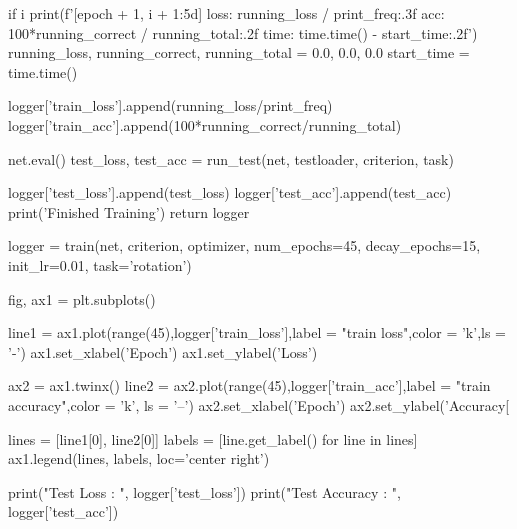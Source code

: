 \documentclass[10pt]{article}
\begin{document}
\begin{python}
            if i %
                print(f'[{epoch + 1}, {i + 1:5d}] loss: {running_loss / print_freq:.3f} acc: {100*running_correct / running_total:.2f} time: {time.time() - start_time:.2f}')
                running_loss, running_correct, running_total = 0.0, 0.0, 0.0
                start_time = time.time()

        logger['train_loss'].append(running_loss/print_freq)
        logger['train_acc'].append(100*running_correct/running_total)

        net.eval()
        test_loss, test_acc = run_test(net, testloader, criterion, task)

    logger['test_loss'].append(test_loss)
    logger['test_acc'].append(test_acc)
    print('Finished Training')
    return logger

logger = train(net, criterion, optimizer, num_epochs=45, decay_epochs=15, init_lr=0.01, task='rotation')

fig, ax1 = plt.subplots()

line1 = ax1.plot(range(45),logger['train_loss'],label = "train loss",color = 'k',ls = '-')
ax1.set_xlabel('Epoch')
ax1.set_ylabel('Loss')

ax2 = ax1.twinx()
line2 = ax2.plot(range(45),logger['train_acc'],label = "train accuracy",color = 'k', ls = '--')
ax2.set_xlabel('Epoch')
ax2.set_ylabel('Accuracy[%

lines = [line1[0], line2[0]]
labels = [line.get_label() for line in lines]
ax1.legend(lines, labels, loc='center right')

print("Test Loss : ", logger['test_loss'])
print("Test Accuracy : ", logger['test_acc'])

\end{python}



\end{document}
